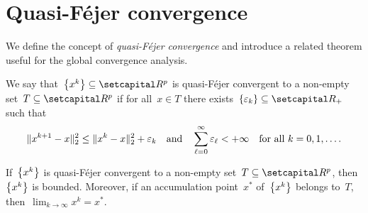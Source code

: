 \documentclass[../main]{subfiles}
\begin{document}
\section{Quasi-F\'ejer convergence} 
We define the concept of \emph{quasi-F\'ejer convergence} and introduce a related theorem useful for the global convergence analysis.
\begin{definition} 
    We say that~$\set*{x^k} \subseteq \setR^p$ is quasi-F\'ejer convergent to a non-empty set~$T \subseteq \setR^p$ if for all~$x \in T$ there exists~$\set{\varepsilon_k} \subseteq \setRpos$ such that
    \begin{equation}
        \norm{x^{k + 1} - x}_2^2 \le \norm{x^k - x}_2^2 + \varepsilon_k \eqand \sum_{\ell = 0}^{\infty} \varepsilon_\ell < + \infty \forallcondition{k = 0, 1, \dots}
    .\end{equation} 
\end{definition}

\begin{theorem} 
    If~$\set*{x^k}$ is quasi-F\'ejer convergent to a non-empty set~$T \subseteq \setR^p$, then~$\set*{x^k}$ is bounded.
    Moreover, if an accumulation point~$x^*$ of~$\set*{x^k}$ belongs to~$T$, then~$\lim_{k \to \infty} x^k = x^*$.
\end{theorem}
\end{document}

